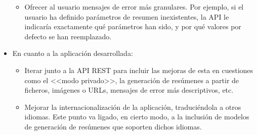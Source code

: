 \begin{itemize}[\textbullet]
\begin{itemize}[◦]
		\item Ofrecer al usuario mensajes de error más granulares. Por ejemplo, si el usuario ha definido parámetros de resumen inexistentes, la API le indicaría exactamente qué parámetros han sido, y por qué valores por defecto se han reemplazado.
	\end{itemize}
	\vspace{1cm}
	\item En cuanto a la aplicación desarrollada:
	\begin{itemize}[◦]
		\item Iterar junto a la API REST para incluir las mejoras de esta en cuestiones como el <<modo privado>>, la generación de resúmenes a partir de ficheros, imágenes o URLs, mensajes de error más descriptivos, etc.
		
		\item Mejorar la internacionalización de la aplicación, traduciéndola a otros idiomas. Este punto va ligado, en cierto modo, a la inclusión de modelos de generación de resúmenes que soporten dichos idiomas.
	\end{itemize}
\end{itemize}